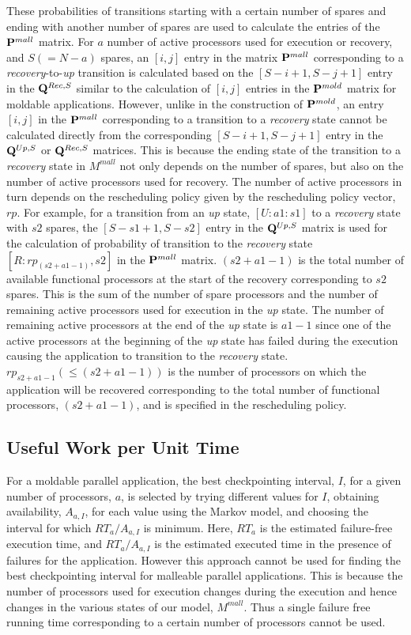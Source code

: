 \documentclass[conference,10pt]{IEEEtran}
\begin{document}
These probabilities of transitions starting with a certain number of
spares and ending with another number of spares are used to calculate
the entries of the ${\bf P}^{mall}$ matrix. For $a$ number of active
processors used for execution or recovery, and $S(=N-a)$ spares, an
$[i,j]$ entry in the matrix ${\bf P}^{mall}$ corresponding to a {\em
  recovery}-to-{\em up} transition is calculated based on the
$[S-i+1,S-j+1]$ entry in the ${\bf Q}^{Rec,S}$ similar to the
calculation of $[i,j]$ entries in the ${\bf P}^{mold}$ matrix for
moldable applications. However, unlike in the construction of ${\bf
  P}^{mold}$, an entry $[i,j]$ in the ${\bf P}^{mall}$ corresponding
to a transition to a {\em recovery} state cannot be calculated
directly from the corresponding $[S-i+1,S-j+1]$ entry in the ${\bf
  Q}^{Up,S}$ or ${\bf Q}^{Rec,S}$ matrices. This is because the ending
state of the transition to a {\em recovery} state in $M^{mall}$ not
only depends on the number of spares, but also on the number of active
processors used for recovery. The number of active processors in turn
depends on the rescheduling policy given by the rescheduling policy
vector, $rp$. For example, for a transition from an {\em up} state,
$[U:a1:s1]$ to a {\em recovery} state with $s2$ spares, the
$[S-s1+1,S-s2]$ entry in the ${\bf Q}^{Up,S}$ matrix is used for the
calculation of probability of transition to the {\em recovery} state
$[R:rp_{(s2+a1-1)},s2]$ in the ${\bf P}^{mall}$ matrix. $(s2+a1-1)$ is
the total number of available functional processors at the start of
the recovery corresponding to $s2$ spares. This is the sum of the
number of spare processors and the number of remaining active
processors used for execution in the {\em up} state. The number of
remaining active processors at the end of the {\em up} state is $a1-1$
since one of the active processors at the beginning of the {\em up}
state has failed during the execution causing the application to
transition to the {\em recovery} state. $rp_{s2+a1-1}(\le (s2+a1-1))$
is the number of processors on which the application will be recovered
corresponding to the total number of functional processors,
$(s2+a1-1)$, and is specified in the rescheduling policy.

\subsection{Useful Work per Unit Time}
\label{uwt}

For a moldable parallel application, the best checkpointing interval,
$I$, for a given number of processors, $a$, is selected by trying
different values for $I$, obtaining availability, $A_{a,I}$, for each
value using the Markov model, and choosing the interval for which
$RT_a/A_{a,I}$ is minimum. Here, $RT_a$ is the estimated failure-free
execution time, and $RT_a/A_{a,I}$ is the estimated executed time in
the presence of failures for the application. However this approach
cannot be used for finding the best checkpointing interval for
malleable parallel applications. This is because the number of
processors used for execution changes during the execution and hence
changes in the various states of our model, $M^{mall}$. Thus a single
failure free running time corresponding to a certain number of
processors cannot be used.
\end{document}

